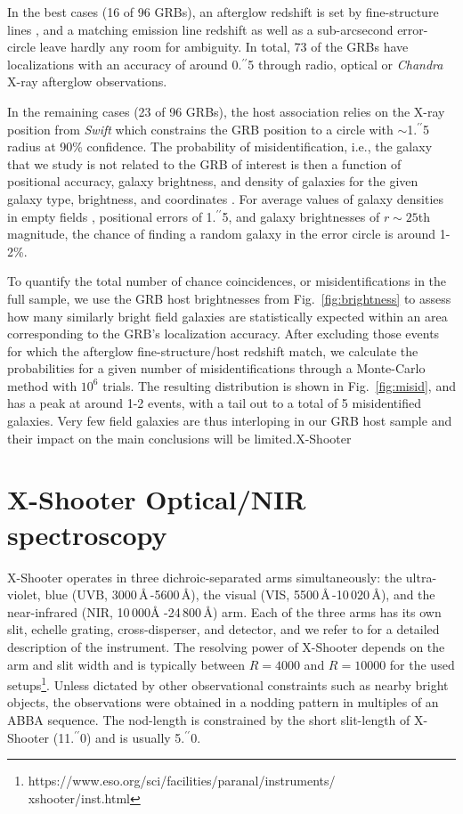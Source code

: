 \documentclass[traditabstract, longauth]{aa}
\newcommand{\farc}{\hbox{$.\!\!^{\prime\prime}$}}
\begin{document}
In the best cases  {(16 of 96 GRBs)}, an afterglow redshift is set by fine-structure lines \citep[e.g.,][]{2007A&A...468...83V}, and a matching emission line redshift as well as a sub-arcsecond error-circle leave hardly any room for ambiguity.  {In total, 73 of the GRBs have localizations with an accuracy of around 0\farc{5} through radio, optical or \textit{Chandra} X-ray afterglow observations.}

In the remaining cases  {(23 of 96 GRBs)}, the host association relies on the X-ray position from \textit{Swift} which constrains the GRB position to a circle with $\sim$1\farc{5} radius at 90\% confidence. The probability of misidentification, i.e., the galaxy that we study is not related to the GRB of interest is then a function of positional accuracy, galaxy brightness, and density of galaxies for the given galaxy type, brightness, and coordinates \citep[e.g.,][]{2014A&A...572A..47R}. For average values of galaxy densities in empty fields \citep{2004AJ....127..180C, 2006ApJS..162....1G}, positional errors of 1\farc{5}, and galaxy brightnesses of $r\sim25$th magnitude, the chance of finding a random galaxy in the error circle is around 1-2\%. 

To quantify the total number of chance coincidences, or misidentifications in the full sample,  {we use the GRB host brightnesses from Fig.~\ref{fig:brightness} to assess how many similarly bright field galaxies \citep{2004AJ....127..180C, 2006ApJS..162....1G} are statistically expected within an area corresponding to the GRB's localization accuracy. After excluding those events for which the afterglow fine-structure/host redshift match, we calculate the probabilities for a given number of misidentifications through a Monte-Carlo method with $10^{6}$ trials. The resulting distribution is shown in Fig.~\ref{fig:misid}, and has a peak at around 1-2 events, with a tail out to a total of 5 misidentified galaxies. Very few field galaxies are thus interloping in our GRB host sample and their impact on the main conclusions will be limited.}X-Shooter

\section{X-Shooter Optical/NIR spectroscopy}
\label{xs}

X-Shooter operates in three dichroic-separated arms simultaneously: the ultra-violet, blue (UVB, 3000\,\AA\,-5600\,\AA), the visual (VIS, 5500\,\AA\,-10\,020\,\AA), and the near-infrared (NIR, 10\,000\AA\,\,-24\,800\,\AA) arm. Each of the three arms has its own slit, echelle grating, cross-disperser, and detector, and we refer to \citet{2011A&A...536A.105V} for a detailed description of the instrument. The resolving power of X-Shooter depends on the arm and slit width and is typically between $R=4000$ and $R=10000$ for the used setups\footnote{https://www.eso.org/sci/facilities/paranal/instruments/\\xshooter/inst.html}. Unless dictated by other observational constraints such as nearby bright objects, the observations were obtained in a nodding pattern in multiples of an ABBA sequence. The nod-length is constrained by the short slit-length of X-Shooter (11\farc{0}) and is usually 5\farc{0}. 
\end{document}
